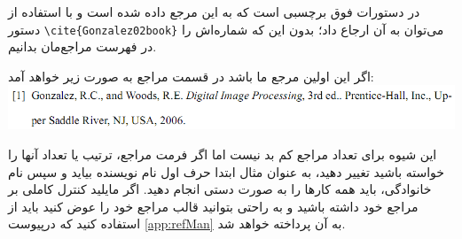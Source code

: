 در دستورات فوق   برچسبی است که به این مرجع داده شده است و با استفاده از دستور 
\verb!\cite{Gonzalez02book}!
می‌توان به آن ارجاع داد؛ بدون این که شماره‌اش را در فهرست مراجع‌مان بدانیم.

اگر این اولین مرجع ما باشد در قسمت مراجع به صورت زیر خواهد آمد:\\
\includegraphics[width=\textwidth]{gonzalez.png}

این شیوه برای تعداد مراجع کم بد نیست اما اگر فرمت مراجع، ترتیب یا تعداد آنها را خواسته باشید تغییر دهید، به عنوان مثال ابتدا حرف اول نام نویسنده بیاید و سپس نام خانوادگی، باید همه کارها را به صورت دستی انجام دهید.
اگر مایلید کنترل کاملی بر مراجع خود داشته باشید و به راحتی بتوانید قالب مراجع خود را عوض کنید باید از  استفاده کنید که درپیوست  \ref{app:refMan} به  آن پرداخته خواهد شد.
